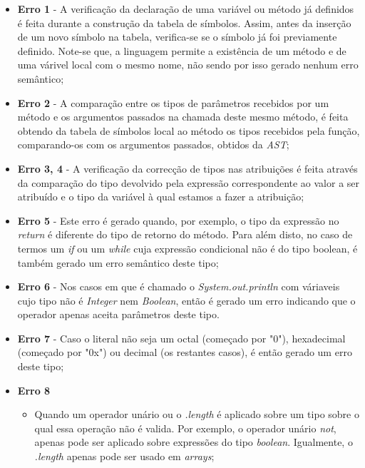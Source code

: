 \documentclass[11pt,a4paper]{article}
\begin{document}
\begin{itemize}
    \item \textbf{Erro 1} - A verificação da declaração de uma variável ou método já definidos é feita durante a construção da tabela de símbolos. Assim, antes da inserção de um novo símbolo na tabela, verifica-se se o símbolo já foi previamente definido. Note-se que, a linguagem permite a existência de um método e de uma várivel local com o mesmo nome, não sendo por isso gerado nenhum erro semântico;
    
    \item \textbf{Erro 2} - A comparação entre os tipos de parâmetros recebidos por um método e os argumentos passados na chamada deste mesmo método, é feita obtendo da tabela de símbolos local ao método os tipos recebidos pela função, comparando-os com os argumentos passados, obtidos da \textit{AST};
    
    \item \textbf{Erro 3, 4} - A verificação da correcção de tipos nas atribuições é feita através da comparação do tipo devolvido pela expressão correspondente ao valor a ser atribuído e o tipo da variável à qual estamos a fazer a atribuição;
    
    \item \textbf{Erro 5} - Este erro é gerado quando, por exemplo, o tipo da expressão no \textit{return} é diferente do tipo de retorno do método. Para além disto, no caso de termos um \textit{if} ou um \textit{while} cuja expressão condicional não é do tipo boolean, é também gerado um erro semântico deste tipo;
    
    \item \textbf{Erro 6} - Nos casos em que é chamado o \textit{System.out.println} com váriaveis cujo tipo não é \textit{Integer} nem \textit{Boolean}, então é gerado um erro indicando que o operador apenas aceita parâmetros deste tipo.
    
    \item \textbf{Erro 7} - Caso o literal não seja um octal (começado por "0"), hexadecimal (começado por "0x") ou decimal (os restantes casos), é então gerado um erro deste tipo;
    
    \item \textbf{Erro 8} 
    
    \begin{itemize}
        \item Quando um operador unário ou o \textit{.length} é aplicado sobre um tipo sobre o qual essa operação não é valida. Por exemplo, o operador unário \textit{not}, apenas pode ser aplicado sobre expressões do tipo \textit{boolean}. Igualmente, o \textit{.length} apenas pode ser usado em \textit{arrays};
        

\end{itemize}
\end{itemize}
\end{document}
